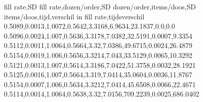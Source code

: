 fill rate,SD fill rate,dozen/order,SD dozen/order,items/doos,SD items/doos,tijd,verschil in fill rate,tijdsverschil
0.5089,0.0013,1.0072,0.5642,3.3168,6.9634,23.1837,0.0,0.0
0.5096,0.0024,1.007,0.5636,3.3178,7.0382,32.5191,0.0007,9.3354
0.5112,0.0011,1.0064,0.5664,3.32,7.0386,49.6715,0.0024,26.4879
0.5154,0.0019,1.006,0.5656,3.3214,7.043,33.5129,0.0065,10.3292
0.5121,0.0013,1.007,0.5614,3.3186,7.0422,51.3758,0.0032,28.1921
0.5125,0.0016,1.007,0.5664,3.319,7.0414,35.0604,0.0036,11.8767
0.5154,0.0007,1.006,0.5634,3.3212,7.0414,45.6508,0.0066,22.4671
0.5114,0.0014,1.0064,0.5638,3.32,7.0156,709.2239,0.0025,686.0402

